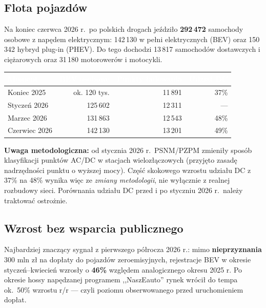 \documentclass[11pt,a4paper]{article}
\begin{document}
	\subsection{Flota pojazdów}
	
	Na koniec czerwca 2026 r.\ po polskich drogach jeździło \textbf{292\,472}
	samochody osobowe z napędem elektrycznym: 142\,130 w pełni elektrycznych
	(BEV) oraz 150\,342 hybryd plug-in (PHEV). Do tego dochodzi 13\,817
	samochodów dostawczych i ciężarowych oraz 31\,180 motorowerów i motocykli.
	
	\begin{center}
		\begin{tabular}{lrrr}
			\toprule
			\rowcolor{granatowy}
			\textcolor{white}{\textbf{Moment}} & \textcolor{white}{\textbf{BEV osobowe}} &
			\textcolor{white}{\textbf{Punkty ładowania}} & \textcolor{white}{\textbf{Udział DC}} \\
			\midrule
			Koniec 2025 & ok. 120 tys. & 11\,891 & 37\% \\
			Styczeń 2026 & 125\,602 & 12\,311 & --- \\
			Marzec 2026 & 131\,863 & 12\,543 & 48\% \\
			Czerwiec 2026 & 142\,130 & 13\,201 & 49\% \\
			\bottomrule
		\end{tabular}
	\end{center}
	
	\begin{zastrzezenie}
		\textbf{Uwaga metodologiczna:} od stycznia 2026 r.\ PSNM/PZPM zmieniły sposób
		klasyfikacji punktów AC/DC w stacjach wielozłączowych (przyjęto zasadę
		nadrzędności punktu o wyższej mocy). Część skokowego wzrostu udziału DC
		z 37\% na 48\% wynika więc ze \emph{zmiany metodologii}, nie wyłącznie
		z realnej rozbudowy sieci. Porównania udziału DC przed i po styczniu 2026
		r.\ należy traktować ostrożnie.
	\end{zastrzezenie}
	
	\subsection{Wzrost bez wsparcia publicznego}
	
	Najbardziej znaczący sygnał z pierwszego półrocza 2026 r.: mimo
	\textbf{nieprzyznania} 300 mln zł na dopłaty do pojazdów zeroemisyjnych,
	rejestracje BEV w okresie styczeń--kwiecień wzrosły o \textbf{46\%} względem
	analogicznego okresu 2025 r. Po okresie hossy napędzanej programem
	,,NaszEauto'' rynek wrócił do tempa ok.\ 50\% wzrostu r/r --- czyli poziomu
	obserwowanego przed uruchomieniem dopłat.
	
\end{document}
